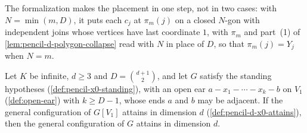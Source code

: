 \begin{fmlnote}
  The formalization makes the placement in one step, not in two cases:
  with $N = \min(m, D)$, it puts each $c_j$ at $\pi_m(j)$ on a closed
  $N$-gon with independent joins whose vertices have last coordinate
  $1$, with $\pi_m$ and part~(1) of \cref{lem:pencil-d-polygon-collapse}
  read with $N$ in place of $D$, so that $\pi_m(j) = Y_j$ when $N = m$.
\end{fmlnote}

\begin{theorem}
  \label{thm:pencil-d-open-ear-long}
  \leanok
  Let $K$ be infinite, $d \ge 3$ and $D = \binom{d+1}{2}$, and let $G$
  satisfy the standing hypotheses (\cref{def:pencil-x0-standing}), with
  an open ear $a - x_1 - \cdots - x_k - b$ on $V_1$ (\cref{def:open-ear})
  with $k \ge D - 1$, whose ends $a$ and $b$ may be adjacent. If the
  general configuration of $G[V_1]$ attains in dimension $d$
  (\cref{def:pencil-d-x0-attains}), then the general configuration of
  $G$ attains in dimension $d$.
\end{theorem}

